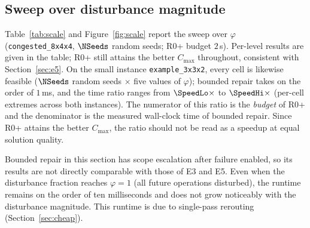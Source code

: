 \subsection{Sweep over disturbance magnitude}
\label{sec:scale}

Table~\ref{tab:scale} and Figure~\ref{fig:scale} report the sweep over \(\varphi\)
(\texttt{congested\_8x4x4}, \(\NSeeds\) random seeds; R0+ budget \(2\)\,s).
Per-level results are given in the table; R0+ still attains the better \(C_{\max}\) throughout, consistent with Section~\ref{sec:e5}.
On the small instance \texttt{example\_3x3x2}, every cell is likewise feasible (\(\NSeeds\) random seeds \(\times\) five
values of \(\varphi\)); bounded repair takes on the order of \(1\)\,ms,
and the time ratio ranges from \(\SpeedLo\times\) to \(\SpeedHi\times\) (per-cell extremes across both instances). The numerator of this ratio is the \emph{budget} of R0+ and the denominator is the measured wall-clock time of bounded repair. Since R0+ attains the better \(C_{\max}\),
the ratio should not be read as a speedup at equal solution quality.

Bounded repair in this section has scope escalation after failure enabled, so its results are not directly comparable with those of E3 and E5.
Even when the disturbance fraction reaches \(\varphi=1\) (all future operations disturbed), the runtime remains on the order of ten milliseconds and does not grow noticeably with the disturbance magnitude.
This runtime is due to single-pass rerouting (Section~\ref{sec:cheap}).

